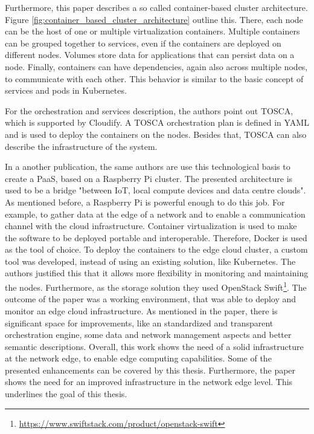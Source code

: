 Furthermore, this paper describes a so called container-based cluster architecture\autocite[cf.][p. 384]{Pahl:2015}.
Figure \ref{fig:container_based_cluster_architecture} outline this.
There, each node can be the host of one or multiple virtualization containers.
Multiple containers can be grouped together to services, even if the containers are deployed on different nodes.\autocite[cf.][p. 384]{Pahl:2015}
Volumes store data for applications that can persist data on a node.\autocite[cf.][p. 384]{Pahl:2015}
Finally, containers can have dependencies, again also across multiple nodes, to communicate with each other.\autocite[cf.][p. 384]{Pahl:2015}
This behavior is similar to the basic concept of services and pods in Kubernetes.

For the orchestration and services description, the authors point out \ac{TOSCA}, which is supported by Cloudify.
A \ac{TOSCA} orchestration plan is defined in \ac{YAML} and is used to deploy the containers on the nodes.
Besides that, \ac{TOSCA} can also describe the infrastructure of the system.

In a another publication, the same authors are use this technological basis to create a \ac{PaaS}, based on a Raspberry Pi cluster\autocite{Pahl:2016}.
The presented architecture is used to be a bridge "between IoT, local compute devices and data centre clouds"\autocite[p. 117]{Pahl:2016}.
As mentioned before, a Raspberry Pi is powerful enough to do this job.
For example, to gather data at the edge of a network and to enable a communication channel with the cloud infrastructure.\autocite[cf.][p. 117]{Pahl:2016}
Container virtualization is used to make the software to be deployed portable and interoperable.\autocite[cf.][p. 117]{Pahl:2016}
Therefore, Docker is used as the tool of choice.
To deploy the containers to the edge cloud cluster, a custom tool was developed, instead of using an existing solution, like Kubernetes.\autocite[cf.][p. 122]{Pahl:2016}
The authors justified this that it allows more flexibility in monitoring and maintaining the nodes.\autocite[cf.][p. 122]{Pahl:2016}
Furthermore, as the storage solution they used OpenStack Swift\footnote{\url{https://www.swiftstack.com/product/openstack-swift}}.
The outcome of the paper was a working environment, that was able to deploy and monitor an edge cloud infrastructure.
As mentioned in the paper, there is significant space for improvements, like an standardized and transparent orchestration engine, some data and network management aspects and better semantic descriptions.
Overall, this work shows the need of a solid infrastructure at the network edge, to enable edge computing capabilities.
Some of the presented enhancements can be covered by this thesis.
Furthermore, the paper shows the need for an improved infrastructure in the network edge level.
This underlines the goal of this thesis.

